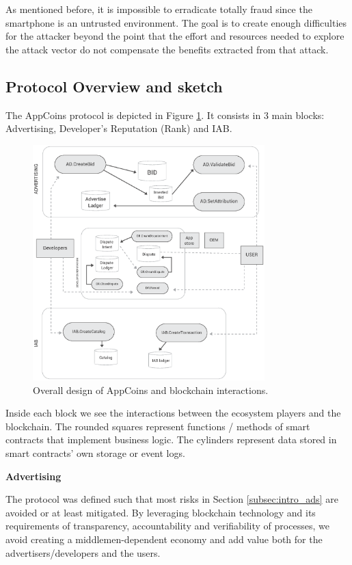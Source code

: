As mentioned before, it is impossible to erradicate totally fraud since the smartphone is an untrusted environment. The goal is to create enough difficulties for the attacker beyond the point that the effort and resources needed to explore the attack vector do not compensate the benefits extracted from that attack.


\subsection{Protocol Overview and sketch}


The AppCoins protocol is depicted in Figure \ref{fig:design}. It consists in 3 main blocks: Advertising, 
Developer's Reputation (Rank) and IAB.

\begin{figure}[!ht]
\centering
\includegraphics[width=0.8\textwidth]{diagrams/design.eps}
\caption{Overall design of AppCoins and blockchain interactions.}
\label{fig:design}
\end{figure}

Inside each block we see the interactions between the ecosystem players and the blockchain. The 
rounded squares represent functions / methods of smart contracts that implement business logic. The 
cylinders represent data stored in smart contracts' own storage or event logs. \\

\medskip

{\bf Advertising}

The protocol was defined such that most risks in Section \ref{subsec:intro_ads} are avoided or at least mitigated. By leveraging blockchain technology and its requirements of transparency, accountability and verifiability of processes, we avoid creating a middlemen-dependent economy and add value both for the advertisers/developers and the users. \\

